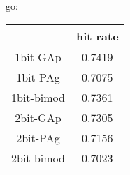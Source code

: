 \documentclass[12pt]{article}
\begin{document}
\begin{CJK*}{UTF8}{gbsn}
go:\\
\begin{tabular}{|c|c|}
\hline 
 & hit rate \\ 
\hline 
1bit-GAp & 0.7419 \\ 
\hline 
1bit-PAg & 0.7075 \\ 
\hline 
1bit-bimod & 0.7361 \\ 
\hline 
2bit-GAp & 0.7305 \\ 
\hline 
2bit-PAg & 0.7156 \\ 
\hline 
2bit-bimod & 0.7023 \\ 
\hline 
\end{tabular} 
\end{CJK*}
\end{document}
